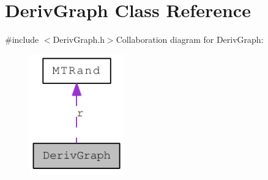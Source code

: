 \hypertarget{classDerivGraph}{
\section{DerivGraph Class Reference}
\label{classDerivGraph}
}


{\ttfamily \#include $<$DerivGraph.h$>$}Collaboration diagram for DerivGraph:\nopagebreak
\begin{figure}[H]
\begin{center}
\leavevmode
\includegraphics[width=116pt]{classDerivGraph__coll__graph}
\end{center}
\end{figure}
